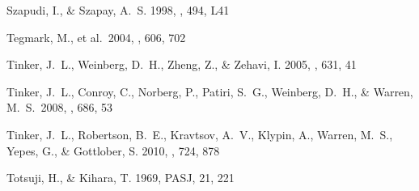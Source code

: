 \documentclass[]{emulateapj}
\begin{document}
\begin{thebibliography}{999}
Szapudi, I., \& Szapay, A.\ S. 1998, \apj, 494, L41



Tegmark, M., et al.\ 2004, \apj, 606, 702 





Tinker, J.\ L., Weinberg, D.\ H., Zheng, Z., \& Zehavi, I. 2005,
\apj, 631, 41

Tinker, J.~L., Conroy, C., Norberg, P., Patiri, S.~G., Weinberg, D.~H.,
\& Warren, M.~S.\ 2008, \apj, 686, 53

Tinker, J.~L., Robertson, B.~E., Kravtsov, A.~V., Klypin, A., Warren, 
M.~S., Yepes, G., \& Gottlober, S. 2010, \apj, 724, 878 

Totsuji, H., \& Kihara, T. 1969, PASJ, 21, 221


\end{thebibliography}
\end{document}
